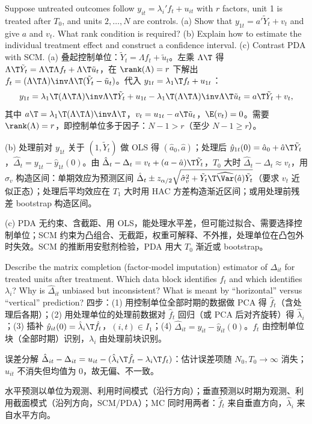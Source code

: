\begin{prac}
Suppose untreated outcomes follow $y_{it}=\lambda_i'f_t+u_{it}$ with $r$ factors, unit 1 is treated after $T_0$, and units $2,\dots,N$ are controls. (a) Show that $y_{1t}=a'\tilde Y_t+v_t$ and give $a$ and $v_t$. What rank condition is required? (b) Explain how to estimate the individual treatment effect and construct a confidence interval. (c) Contrast PDA with SCM.
\answer
(a) 叠起控制单位：$\tilde Y_t=\Lambda f_t+\tilde u_t$。左乘 $\Lambda\T$ 得 $\Lambda\T\tilde Y_t=\Lambda\T\Lambda f_t+\Lambda\T\tilde u_t$，在 $\rank(\Lambda)=r$ 下解出 $f_t=(\Lambda\T\Lambda)\inv\Lambda\T(\tilde Y_t-\tilde u_t)$。代入 $y_{1t}=\lambda_1\T f_t+u_{1t}$：
\[
y_{1t}=\lambda_1\T(\Lambda\T\Lambda)\inv\Lambda\T\tilde Y_t+u_{1t}-\lambda_1\T(\Lambda\T\Lambda)\inv\Lambda\T\tilde u_t=a\T\tilde Y_t+v_t,
\]
其中 $a\T=\lambda_1\T(\Lambda\T\Lambda)\inv\Lambda\T$，$v_t=u_{1t}-a\T\tilde u_t$，$\E(v_t)=0$。需要 $\rank(\Lambda)=r$，即控制单位多于因子：$N-1>r$（至少 $N-1\ge r$）。

(b) 处理前对 $y_{1t}$ 关于 $(1,\tilde Y_t)$ 做 OLS 得 $(\hat a_0,\hat a)$；处理后 $\hat y_{1t}(0)=\hat a_0+\hat a\T\tilde Y_t$，$\hat\Delta_t=y_{1t}-\hat y_{1t}(0)$。由 $\hat\Delta_t-\Delta_t=v_t+(a-\hat a)\T\tilde Y_t$，$T_0$ 大时 $\hat\Delta_t-\Delta_t\approx v_t$，用 $\hat\sigma_v$ 构造区间：单期效应为预测区间 $\hat\Delta_t\pm z_{\alpha/2}\sqrt{\hat\sigma_v^2+\tilde Y_t\T\widehat{\Var}(\hat a)\tilde Y_t}$（要求 $v_t$ 近似正态）；处理后平均效应在 $T_1$ 大时用 HAC 方差构造渐近区间；或用处理前残差 bootstrap 构造区间。

(c) PDA 无约束、含截距、用 OLS，能处理水平差，但可能过拟合、需要选择控制单位；SCM 约束为凸组合、无截距，权重可解释、不外推，处理单位在凸包外时失效。SCM 的推断用安慰剂检验，PDA 用大 $T_0$ 渐近或 bootstrap。
\end{prac}

\begin{prac}
Describe the matrix completion (factor-model imputation) estimator of $\Delta_{it}$ for treated units after treatment. Which data block identifies $f_t$ and which identifies $\lambda_i$? Why is $\hat\Delta_{it}$ unbiased but inconsistent? What is meant by ``horizontal'' versus ``vertical'' prediction?
\answer
四步：(1) 用控制单位全部时期的数据做 PCA 得 $\hat f_t$（含处理后各期）；(2) 用处理单位的处理前数据对 $\hat f_t$ 回归（或 PCA 后对齐旋转）得 $\hat\lambda_i$；(3) 插补 $\hat y_{it}(0)=\hat\lambda_i\T\hat f_t$，$(i,t)\in I_1$；(4) $\hat\Delta_{it}=y_{it}-\hat y_{it}(0)$。$f_t$ 由控制单位块（全部时期）识别，$\lambda_i$ 由处理前块识别。

误差分解 $\hat\Delta_{it}-\Delta_{it}=u_{it}-(\hat\lambda_i\T\hat f_t-\lambda_i\T f_t)$：估计误差项随 $N_0,T_0\to\infty$ 消失；$u_{it}$ 不消失但均值为 0，故无偏、不一致。

水平预测以单位为观测、利用时间模式（沿行方向）；垂直预测以时期为观测、利用截面模式（沿列方向，SCM/PDA）；MC 同时用两者：$\hat f_t$ 来自垂直方向，$\hat\lambda_i$ 来自水平方向。
\end{prac}

